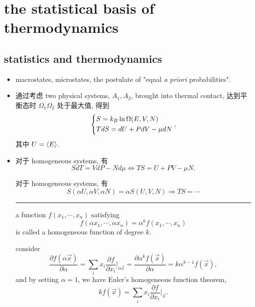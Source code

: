 \chapter{the statistical basis of thermodynamics}
\section{statistics and thermodynamics}
\begin{itemize}
	\item macrostates, microstates, the postulate of "equal \textit{a priori} probabilities".
	
	\item 通过考虑 two physical systems, $A_1, A_2$, brought into thermal contact, 达到平衡态时 $\Omega_1 \Omega_2$ 处于最大值, 得到
	\begin{equation}
		\begin{dcases}
			S = k_B \ln \Omega(E, V, N) \\
			T dS = dU + P dV - \mu dN
		\end{dcases},
	\end{equation}
	其中 $U = \braket{E}$.
	
	\item 对于 homogeneous systems, 有
	\begin{equation}
		S dT = V dP - N d\mu \iff T S = U + P V - \mu N.
	\end{equation}
	
	\begin{tcolorbox}[title=homogeneity relations:]
		对于 homogeneous systems, 有
		\begin{equation}
			S(\alpha U, \alpha V, \alpha N) = \alpha S(U, V, N) \Longrightarrow T S = \cdots
		\end{equation}
		
		\noindent\rule[0.5ex]{\linewidth}{0.5pt} %
		
		a function $f(x_1, \cdots, x_n)$ satisfying
		\begin{equation}
			f(\alpha x_1, \cdots, \alpha x_n) = \alpha^k f(x_1, \cdots, x_n)
		\end{equation}
		is called a homogeneous function of degree $k$.
		
		consider
		\begin{equation}
			\frac{\partial f(\alpha \vec{x})}{\partial \alpha} = \sum_i x_i \frac{\partial f}{\partial x_i} \Big|_{\alpha \vec{x}} = \frac{\partial \alpha^k f(\vec{x})}{\partial \alpha} = k \alpha^{k - 1} f(\vec{x}),
		\end{equation}
		and by setting $\alpha = 1$, we have Euler's homogeneous function theorem,
		\begin{equation}
			k f(\vec{x}) = \sum_i x_i \frac{\partial f}{\partial x_i} \Big|_{\vec{x}}.
		\end{equation}
	\end{tcolorbox}
	

\end{itemize}
